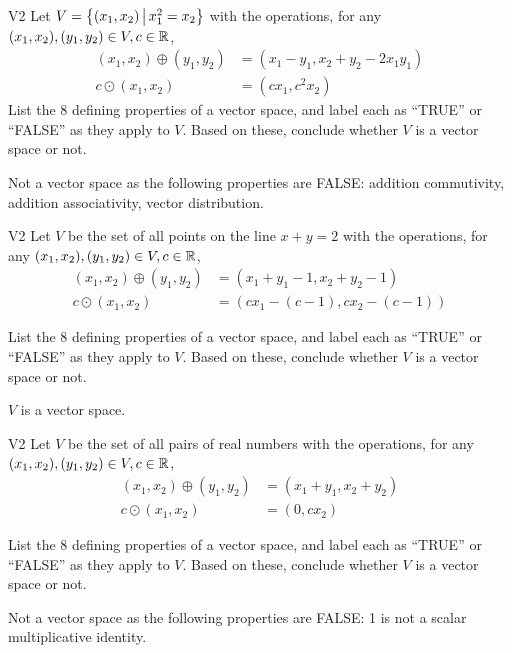 \begin{problem}{V2}
Let \(V=\left\{ (x_1,x_2)\,\middle|\,x_1^2=x_2\right\}\) with the operations, for any \((x_1,x_2), (y_1,y_2) \in V,c \in \mathbb{R}\),
\begin{align*}
(x_1,x_2) \oplus (y_1,y_2) &= (x_1-y_1,x_2+y_2-2x_1y_1) \\
c \odot (x_1,x_2) &= (cx_1, c^2x_2)
\end{align*}
  List the 8 defining properties of a vector space, and label each as
  ``TRUE'' or ``FALSE'' as they apply to \(V\). Based on these, conclude whether
  \(V\) is a vector space or not.

\end{problem}
\begin{solution}
Not a vector space as the following properties are FALSE:
addition commutivity, addition associativity, vector distribution.
\end{solution}


 \begin{problem}{V2}
 Let \(V\) be the set of all points on the line \(x+y=2\) with the operations, for any \((x_1,x_2), (y_1,y_2) \in V,c \in \mathbb{R}\),
 \begin{align*}
 (x_1,x_2) \oplus (y_1,y_2) &= (x_1+y_1-1,x_2+y_2-1) \\
 c \odot (x_1,x_2) &= (cx_1-(c-1), cx_2-(c-1))
 \end{align*}

   List the 8 defining properties of a vector space, and label each as
   ``TRUE'' or ``FALSE'' as they apply to \(V\). Based on these, conclude whether
   \(V\) is a vector space or not.

 \end{problem}
 \begin{solution}
 \(V\) is a vector space.
 \end{solution}
%
 \begin{problem}{V2}
 Let \(V\) be the set of all pairs of real numbers with the operations, for any \((x_1,x_2), (y_1,y_2) \in V,c \in \mathbb{R}\),
 \begin{align*}
 (x_1,x_2) \oplus (y_1,y_2) &= (x_1+y_1,x_2+y_2) \\
 c \odot (x_1,x_2) &= (0, cx_2)
 \end{align*}

   List the 8 defining properties of a vector space, and label each as
   ``TRUE'' or ``FALSE'' as they apply to \(V\). Based on these, conclude whether
   \(V\) is a vector space or not.
 \end{problem}
 \begin{solution}
 Not a vector space as the following properties are FALSE: 1 is not a scalar multiplicative identity.
 \end{solution}
 
